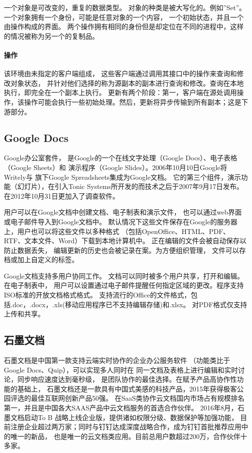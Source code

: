 \documentclass[11pt]{ctexart}
\begin{document}
一个对象是可改变的，重复的数据类型。
对象的种类是被大写化的。例如”Set”。
一个对象拥有一个身份，可能是任意对象的一个内容，
一个初始状态，并且一个由操作构成的界面。
两个操作拥有相同的身份但是却定位在不同的进程中，这样的情况被称为另一个的复制品。

\paragraph{操作}
该环境由未指定的客户端组成，
这些客户端通过调用其接口中的操作来查询和修改对象状态，
并针对他们选择的称为源副本的副本进行查询和修改。查询在本地执行，即完全在一个副本上执行。
更新有两个阶段：第一，客户端在源处调用操作，该操作可能会执行一些初始处理。然后，更新将异步传输到所有副本；这是下游部分。

\subsection{Google Docs}

Google办公室套件，
是Google的一个在线文字处理（Google Docs）、电子表格（Google Sheets）和
演示程序（Google Slides）。2006年10月10日Google将Writely与
旗下Google Spreadsheets集成为Google文档。
它的第三个组件，演示功能（幻灯片），在引入Tonic Systems所开发的而技术之后于2007年9月17日发布。
在2012年10月31日更加入了调查软件。

用户可以在Google文档中创建文档、电子制表和演示文件，
也可以通过web界面或电子邮件导入到Google文档中。
默认情况下这些文件保存在Google的服务器上，用户也可以将这些文件以多种格式
（包括OpenOffice、HTML、PDF、RTF、文本文件、Word）下载到本地计算机中。
正在编辑的文件会被自动保存以防止数据丢失，
编辑更新的历史也会被记录在案。为方便组织管理，
文件可以存档或加上自定义的标签。

Google文档支持多用户协同工作。
文档可以同时被多个用户共享，打开和编辑。在电子制表中，
用户可以设置通过电子邮件提醒任何指定区域的更改。程序支持ISO标准的开放文档格式格式。
支持流行的Office的文件格式，包括.doc，.docx，.xls(移动应用程序已不支持编辑存储)和.xlsx。
对PDF格式仅支持上传和共享。

\subsection{石墨文档}
石墨文档是中国第一款支持云端实时协作的企业办公服务软件
（功能类比于Google Docs、Quip），可以实现多人同时在
同一文档及表格上进行编辑和实时讨论，同步响应速度达到毫秒级，
是团队协作的最佳选择。在赋予产品高协作性功能的基础上，
石墨文档还是一款具有中国式美感的科技产品，2015年获得极客公园评选的最佳互联网创新产品50强。
在SaaS类协作云文档国内市场占有规模排名第一，并且是中国各大SAAS产品中云文档服务的首选合作伙伴。
2016年8月，石墨文档启动To B 战略上线企业版，提供诸如权限分级、数据保护等加强功能，
目前注册企业超过两万家；同时与钉钉达成深度战略合作，成为钉钉首批推荐应用中的唯一的新品，
也是唯一的云文档类应用。目前总用户数超过200万，合作伙伴十多家。

\nocite{*}


\end{document}
